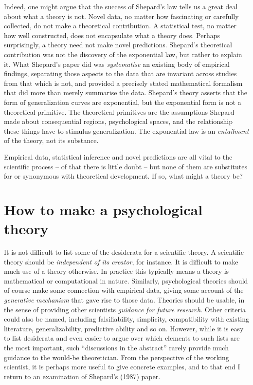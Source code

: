 \documentclass[english,doc]{apa6}
\begin{document}
Indeed, one might argue that the success of Shepard's law tells us a great deal about what a theory is not. Novel data, no matter how fascinating or carefully collected, do not make a theoretical contribution. A statistical test, no matter how well constructed, does not encapsulate what a theory does. Perhaps surprisingly, a theory need not make novel predictions. Shepard's theoretical contribution was not the discovery of the exponential law, but rather to explain it. What Shepard's paper did was \emph{systematise} an existing body of empirical findings, separating those aspects to the data that are invariant across studies from that which is not, and provided a precisely stated mathematical formalism that did more than merely summarise the data. Shepard's theory asserts that the form of generalization curves are exponential, but the exponential form is not a theoretical primitive. The theoretical primitives are the assumptions Shepard made about consequential regions, psychological spaces, and the relationship these things have to stimulus generalization. The exponential law is an \emph{entailment} of the theory, not its substance.

Empirical data, statistical inference and novel predictions are all vital to the scientific process -- of that there is little doubt -- but none of them are substitutes for or synonymous with theoretical development. If so, what might a theory be?

\hypertarget{how-to-make-a-psychological-theory}{%
\section{How to make a psychological theory}\label{how-to-make-a-psychological-theory}}

It is not difficult to list some of the desiderata for a scientific theory. A scientific theory should be \emph{independent of its creator}, for instance. It is difficult to make much use of a theory otherwise. In practice this typically means a theory is mathematical or computational in nature. Similarly, psychological theories should of course make some connection with empirical data, giving some account of the \emph{generative mechanism} that gave rise to those data. Theories should be usable, in the sense of providing other scientists \emph{guidance for future research}. Other criteria could also be named, including falsifiability, simplicity, compatibility with existing literature, generalizability, predictive ability and so on. However, while it is easy to list desiderata and even easier to argue over which elements to such lists are the most important, such ``discussions in the abstract'' rarely provide much guidance to the would-be theoretician. From the perspective of the working scientist, it is perhaps more useful to give concrete examples, and to that end I return to an examination of Shepard's (1987) paper.
\end{document}
